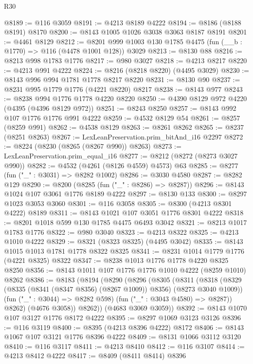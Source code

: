\begin{lexlean}{R30}
\begin{coremodule}
{{{{{@8189 := @116 @3059
@8191 := @4213 @8189 @4222
@8194 := @8186 (@8188 @8191) @8170
@8200 := @8143 @1005 @1026 @3038 @3063 @8187 @8191
@8201 := @4461 @8129
@8212 := @8201 @999 @1003 @130 @1785 @4475 (fun (__b : @1770) => @116 (@4478 @1001 @128)) @3029
@8213 := @8130 @88
@8216 := @8213 @998 @1783 @1776
@8217 := @980 @3027
@8218 := @4213 @8217
@8220 := @4213 @991 @4222
@8224 := @8216 (@8218 @8220) (@4495 @3029)
@8230 := @8143 @996 @994 @1781 @1778 @8217 @8220
@8231 := @8130 @90
@8237 := @8231 @995 @1779 @1776 (@4221 @8220) @8217
@8238 := @8143 @977
@8243 := @8238 @994 @1776 @1778 @4220 @8220
@8250 := @4390 @8129 @972 @4220 (@4395 (@4396 @8129 @972))
@8251 := @8243 @8250
@8257 := @8143 @992 @107 @1776 @1776 @991 @4222
@8259 := @4532 @8129 @54
@8261 := @8257 (@8259 @991)
@8262 := @4538 @8129
@8263 := @8261 @8262
@8265 := @8237 (@8251 @8263)
@8267 := LexLeanPreservation.prim_bitAnd_i16 @2297
@8272 := @8224 (@8230 (@8265 (@8267 @990)) @8263)
@8273 := LexLeanPreservation.prim_equal_i16
@8277 := @8212 (@8272 (@8273 @3027 @990))
@8282 := @4532 (@4261 (@8126 @4559) @4573) @63
@8285 := @8277 (fun ("_" : @3031) => @8282 @1002)
@8286 := @3030 @4580
@8287 := @8282 @129
@8290 := @8200 (@8285 (fun ("_" : @8286) => @8287))
@8296 := @8143 @1024 @107 @3061 @1776 @8189 @4222
@8297 := @8130 @133
@8300 := @8297 @1023 @3053 @3060
@8301 := @116 @3058
@8305 := @8300 (@4213 @8301 @4222) @8189
@8311 := @8143 @1021 @107 @3051 @1776 @8301 @4222
@8318 := @8201 @1018 @599 @130 @1785 @4475 @6493 @3042
@8321 := @8213 @1017 @1783 @1776
@8322 := @980 @3040
@8323 := @4213 @8322
@8325 := @4213 @1010 @4222
@8329 := @8321 (@8323 @8325) (@4495 @3042)
@8335 := @8143 @1015 @1013 @1781 @1778 @8322 @8325
@8341 := @8231 @1014 @1779 @1776 (@4221 @8325) @8322
@8347 := @8238 @1013 @1776 @1778 @4220 @8325 @8250
@8356 := @8143 @1011 @107 @1776 @1776 @1010 @4222 (@8259 @1010) @8262
@8386 := @8183
    (@8194
      (@8290
        (@8296
          (@8305
            (@8311
              (@8318
                (@8329 (@8335 (@8341 (@8347 @8356) (@8267 @1009)) @8356) (@8273 @3040 @1009))
                (fun ("_" : @3044) => @8282 @598)
                (fun ("_" : @3043 @4580) => @8287))
              @8262)
            (@4676 @3058))
          @8262))
      (@4683 @3069 @3059))
@8392 := @8143 @1070 @107 @3127 @1776 @8172 @4222
@8395 := @8297 @1069 @3123 @3126
@8396 := @116 @3119
@8400 := @8395 (@4213 @8396 @4222) @8172
@8406 := @8143 @1067 @107 @3121 @1776 @8396 @4222
@8409 := @8131 @1066 @3112 @3120
@8410 := @116 @3117
@8411 := @4213 @8410
@8412 := @116 @3107
@8414 := @4213 @8412 @4222
@8417 := @8409 (@8411 @8414) @8396
}}}}}
\end{coremodule}
\end{lexlean}
